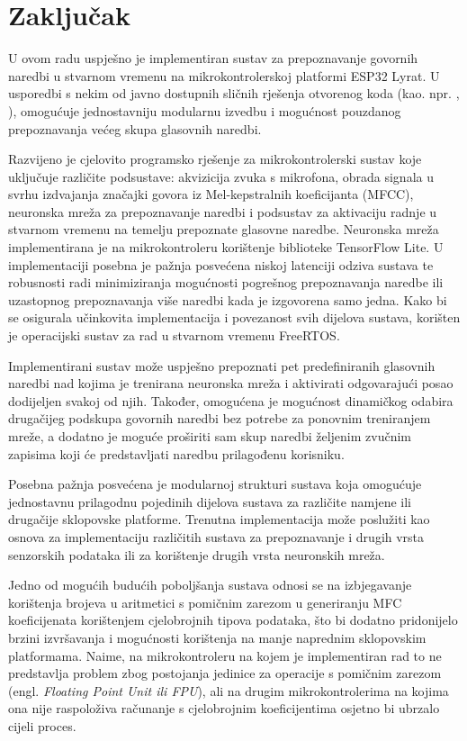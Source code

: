 \chapter{Zaključak}
\label{pog:zakljucak}

U ovom radu uspješno je implementiran sustav za prepoznavanje govornih naredbi u stvarnom vremenu 
na mikrokontrolerskoj platformi ESP32 Lyrat. U usporedbi s nekim od javno dostupnih sličnih rješenja otvorenog koda (kao. npr. \cite{arm_kws}, \cite{tflmicrospeech}), omogućuje jednostavniju modularnu izvedbu i mogućnost pouzdanog prepoznavanja većeg skupa glasovnih naredbi. 

Razvijeno je cjelovito programsko rješenje za mikrokontrolerski sustav koje uključuje različite podsustave: akvizicija zvuka s mikrofona, obrada signala u svrhu izdvajanja značajki govora iz Mel-kepstralnih koeficijanta (MFCC), neuronska mreža za prepoznavanje naredbi i podsustav za aktivaciju radnje u stvarnom vremenu na temelju prepoznate glasovne naredbe. Neuronska mreža implementirana je na mikrokontroleru korištenje biblioteke TensorFlow Lite. U implementaciji posebna je pažnja posvećena niskoj latenciji odziva sustava te robusnosti radi minimiziranja mogućnosti pogrešnog prepoznavanja naredbe ili uzastopnog prepoznavanja više naredbi kada je izgovorena samo jedna. Kako bi se osigurala učinkovita implementacija i povezanost svih dijelova sustava, korišten je operacijski sustav za rad u stvarnom vremenu FreeRTOS.

Implementirani sustav može uspješno prepoznati pet predefiniranih glasovnih naredbi nad kojima je trenirana neuronska mreža i aktivirati odgovarajući posao dodijeljen svakoj od njih. Također, omogućena je mogućnost dinamičkog odabira drugačijeg podskupa govornih naredbi bez potrebe za ponovnim treniranjem mreže, a  dodatno je moguće proširiti sam skup naredbi željenim zvučnim zapisima koji će predstavljati naredbu prilagođenu korisniku.

Posebna pažnja posvećena je modularnoj strukturi sustava koja omogućuje jednostavnu prilagodnu pojedinih dijelova sustava za različite namjene ili drugačije sklopovske platforme. Trenutna implementacija može poslužiti kao osnova za implementaciju različitih sustava za prepoznavanje i drugih vrsta senzorskih podataka ili za korištenje drugih vrsta neuronskih mreža. 

Jedno od mogućih budućih poboljšanja sustava odnosi se na izbjegavanje korištenja brojeva u aritmetici s pomičnim zarezom u generiranju MFC koeficijenata korištenjem cjelobrojnih tipova podataka, što bi dodatno pridonijelo brzini izvršavanja i mogućnosti korištenja na manje naprednim sklopovskim platformama. Naime, na mikrokontroleru na kojem je implementiran rad to ne predstavlja problem zbog postojanja jedinice za operacije s pomičnim zarezom (engl. \textit{Floating Point Unit ili FPU}), ali na drugim mikrokontrolerima na kojima ona nije raspoloživa računanje s cjelobrojnim koeficijentima osjetno bi ubrzalo cijeli proces.
